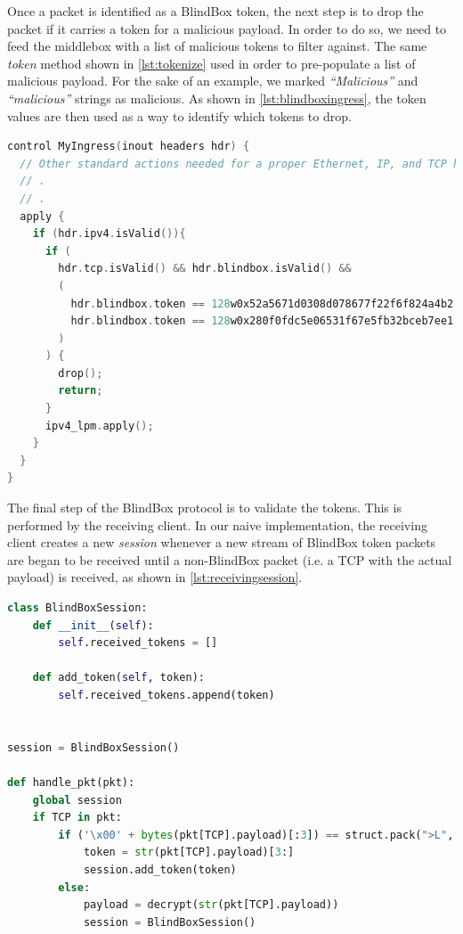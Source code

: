 \documentclass{winslabreport}
\begin{document}
Once a packet is identified as a BlindBox token, the next step is to drop the packet if it carries a token for a malicious payload. In order to do so, we need to feed the middlebox with a list of malicious tokens to filter against. The same \emph{token} method shown in \autoref{lst:tokenize} used in order to pre-populate a list of malicious payload. For the sake of an example, we marked \emph{``Malicious''} and \emph{``malicious''} strings as malicious. As shown in \autoref{lst:blindboxingress}, the token values are then used as a way to identify which tokens to drop.

\begin{lstlisting}[caption={Middlebox Ingress},label={lst:blindboxingress},language=C]
control MyIngress(inout headers hdr) {
  // Other standard actions needed for a proper Ethernet, IP, and TCP handling.
  // .
  // .
  apply {
    if (hdr.ipv4.isValid()){
      if (
        hdr.tcp.isValid() && hdr.blindbox.isValid() &&
        (
          hdr.blindbox.token == 128w0x52a5671d0308d078677f22f6f824a4b2 ||
          hdr.blindbox.token == 128w0x280f0fdc5e06531f67e5fb32bceb7ee1
        )
      ) {
        drop();
        return;
      }
      ipv4_lpm.apply();
    }
  }
}
\end{lstlisting}

The final step of the BlindBox protocol is to validate the tokens. This is performed by the receiving client. In our naive implementation, the receiving client creates a new \emph{session} whenever a new stream of BlindBox token packets are began to be received until a non-BlindBox packet (i.e. a TCP with the actual payload) is received, as shown in \autoref{lst:receivingsession}. 

\begin{lstlisting}[caption={Receiving Tokens},label={lst:receivingsession},language=Python]
class BlindBoxSession:
    def __init__(self):
        self.received_tokens = []

    def add_token(self, token):
        self.received_tokens.append(token)


session = BlindBoxSession()

def handle_pkt(pkt):
    global session
    if TCP in pkt:
        if ('\x00' + bytes(pkt[TCP].payload)[:3]) == struct.pack(">L", TYPE_BLINDBOX):
            token = str(pkt[TCP].payload)[3:]
            session.add_token(token)
        else:
            payload = decrypt(str(pkt[TCP].payload))
            session = BlindBoxSession()
\end{lstlisting}
\end{document}
